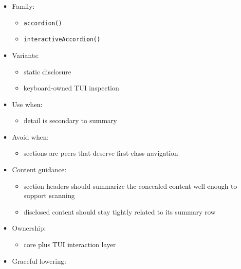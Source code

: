 \begin{itemize}
\tightlist
\item
  Family:

  \begin{itemize}
  \tightlist
  \item
    \texttt{a\allowbreak{}c\allowbreak{}c\allowbreak{}o\allowbreak{}r\allowbreak{}d\allowbreak{}i\allowbreak{}o\allowbreak{}n\allowbreak{}(\allowbreak{})}
  \item
    \texttt{i\allowbreak{}n\allowbreak{}t\allowbreak{}e\allowbreak{}r\allowbreak{}a\allowbreak{}c\allowbreak{}t\allowbreak{}i\allowbreak{}v\allowbreak{}e\allowbreak{}A\allowbreak{}c\allowbreak{}c\allowbreak{}o\allowbreak{}r\allowbreak{}d\allowbreak{}i\allowbreak{}o\allowbreak{}n\allowbreak{}(\allowbreak{})}
  \end{itemize}
\item
  Variants:

  \begin{itemize}
  \tightlist
  \item
    static disclosure
  \item
    keyboard-owned TUI inspection
  \end{itemize}
\item
  Use when:

  \begin{itemize}
  \tightlist
  \item
    detail is secondary to summary
  \end{itemize}
\item
  Avoid when:

  \begin{itemize}
  \tightlist
  \item
    sections are peers that deserve first-class navigation
  \end{itemize}
\item
  Content guidance:

  \begin{itemize}
  \tightlist
  \item
    section headers should summarize the concealed content well enough to support scanning
  \item
    disclosed content should stay tightly related to its summary row
  \end{itemize}
\item
  Ownership:

  \begin{itemize}
  \tightlist
  \item
    core plus TUI interaction layer
  \end{itemize}
\item
  Graceful lowering:


\end{itemize}

